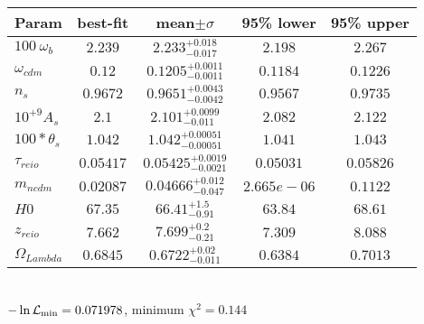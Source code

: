 \begin{tabular}{|l|c|c|c|c|} 
 \hline 
Param & best-fit & mean$\pm\sigma$ & 95\% lower & 95\% upper \\ \hline 
$100~\omega{}_{b }$ &$2.239$ & $2.233_{-0.017}^{+0.018}$ & $2.198$ & $2.267$ \\ 
$\omega{}_{cdm }$ &$0.12$ & $0.1205_{-0.0011}^{+0.0011}$ & $0.1184$ & $0.1226$ \\ 
$n_{s }$ &$0.9672$ & $0.9651_{-0.0042}^{+0.0043}$ & $0.9567$ & $0.9735$ \\ 
$10^{+9}A_{s }$ &$2.1$ & $2.101_{-0.011}^{+0.0099}$ & $2.082$ & $2.122$ \\ 
$100*\theta{}_{s }$ &$1.042$ & $1.042_{-0.00051}^{+0.00051}$ & $1.041$ & $1.043$ \\ 
$\tau{}_{reio }$ &$0.05417$ & $0.05425_{-0.0021}^{+0.0019}$ & $0.05031$ & $0.05826$ \\ 
$m_{ncdm }$ &$0.02087$ & $0.04666_{-0.047}^{+0.012}$ & $2.665e-06$ & $0.1122$ \\ 
$H0$ &$67.35$ & $66.41_{-0.91}^{+1.5}$ & $63.84$ & $68.61$ \\ 
$z_{reio }$ &$7.662$ & $7.699_{-0.21}^{+0.2}$ & $7.309$ & $8.088$ \\ 
$\Omega{}_{Lambda }$ &$0.6845$ & $0.6722_{-0.011}^{+0.02}$ & $0.6384$ & $0.7013$ \\ 
\hline 
 \end{tabular} \\ 
$-\ln{\cal L}_\mathrm{min} =0.071978$, minimum $\chi^2=0.144$ \\ 
